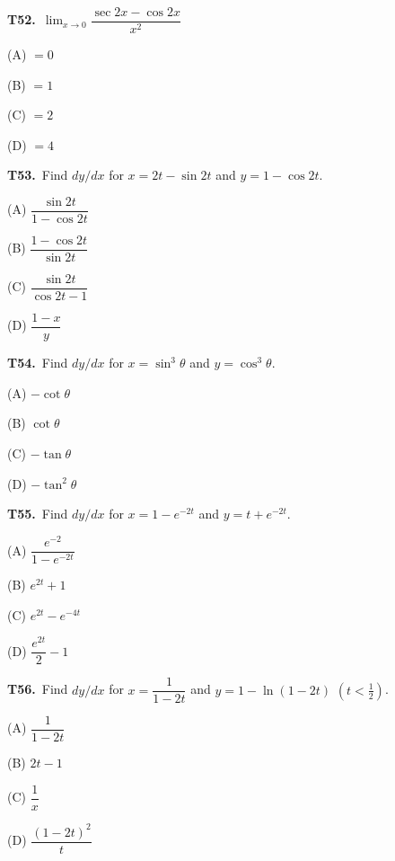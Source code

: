 \documentclass[11pt]{article}
\begin{document}
\bigskip\noindent\textbf{T52.}\ $\displaystyle\lim_{x\to 0}\dfrac{\sec 2x - \cos 2x}{x^2}$
\begin{list}{}{\setlength{\leftmargin}{3em}\setlength{\labelwidth}{2.5em}\setlength{\itemsep}{0pt}\setlength{\topsep}{2pt}}
\item[(A)] $=0$
\item[(B)] $=1$
\item[(C)] $=2$
\item[(D)] $=4$
\end{list}

\bigskip\noindent\textbf{T53.}\ Find $dy/dx$ for $x = 2t - \sin 2t$ and $y = 1 - \cos 2t$.
\begin{list}{}{\setlength{\leftmargin}{3em}\setlength{\labelwidth}{2.5em}\setlength{\itemsep}{0pt}\setlength{\topsep}{2pt}}
\item[(A)] $\dfrac{\sin 2t}{1-\cos 2t}$
\item[(B)] $\dfrac{1-\cos 2t}{\sin 2t}$
\item[(C)] $\dfrac{\sin 2t}{\cos 2t - 1}$
\item[(D)] $\dfrac{1-x}{y}$
\end{list}

\bigskip\noindent\textbf{T54.}\ Find $dy/dx$ for $x = \sin^3\theta$ and $y = \cos^3\theta$.
\begin{list}{}{\setlength{\leftmargin}{3em}\setlength{\labelwidth}{2.5em}\setlength{\itemsep}{0pt}\setlength{\topsep}{2pt}}
\item[(A)] $-\cot\theta$
\item[(B)] $\cot\theta$
\item[(C)] $-\tan\theta$
\item[(D)] $-\tan^2\theta$
\end{list}

\bigskip\noindent\textbf{T55.}\ Find $dy/dx$ for $x = 1-e^{-2t}$ and $y = t+e^{-2t}$.
\begin{list}{}{\setlength{\leftmargin}{3em}\setlength{\labelwidth}{2.5em}\setlength{\itemsep}{0pt}\setlength{\topsep}{2pt}}
\item[(A)] $\dfrac{e^{-2}}{1-e^{-2t}}$
\item[(B)] $e^{2t}+1$
\item[(C)] $e^{2t}-e^{-4t}$
\item[(D)] $\dfrac{e^{2t}}{2}-1$
\end{list}

\bigskip\noindent\textbf{T56.}\ Find $dy/dx$ for $x = \dfrac{1}{1-2t}$ and $y = 1-\ln(1-2t)$ $(t<\tfrac{1}{2})$.
\begin{list}{}{\setlength{\leftmargin}{3em}\setlength{\labelwidth}{2.5em}\setlength{\itemsep}{0pt}\setlength{\topsep}{2pt}}
\item[(A)] $\dfrac{1}{1-2t}$
\item[(B)] $2t-1$
\item[(C)] $\dfrac{1}{x}$
\item[(D)] $\dfrac{(1-2t)^2}{t}$
\end{list}
\end{document}
